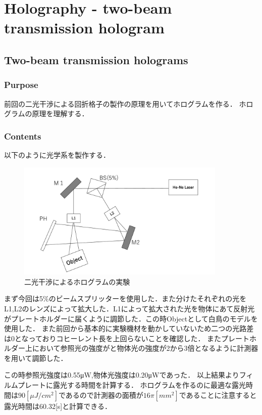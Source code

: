 \documentclass[11pt, a4paper]{jsarticle}
\begin{document}
\section{Holography - two-beam transmission hologram}
\subsection{Two-beam transmission holograms}
\subsubsection{Purpose}
前回の二光干渉による回折格子の製作の原理を用いてホログラムを作る．
ホログラムの原理を理解する．
\subsubsection{Contents}
以下のように光学系を製作する．

\begin{figure}[htbp]
 \begin{center}
  \includegraphics[width=100mm]{fig23.png}
 \end{center}
 \caption{二光干渉によるホログラムの実験}
 \label{fig:23}
\end{figure}

まず今回は5\%のビームスプリッターを使用した．また分けたそれぞれの光をL1,L2のレンズによって拡大した．L1によって拡大された光を物体にあて反射光がプレートホルダーに届くように調節した．この時Objectとして白鳥のモデルを使用した．
また前回から基本的に実験機材を動かしていないため二つの光路差は0となっておりコヒーレント長を上回らないことを確認した．
またプレートホルダー上において参照光の強度がと物体光の強度が2から3倍となるように計測器を用いて調節した．

この時参照光強度は0.55μW,物体光強度は0.20μWであった．
以上結果よりフィルムプレートに露光する時間を計算する．
ホログラムを作るのに最適な露光時間は$90[\mu J/cm^2]$であるので計測器の面積が$16\pi [mm^2]$であることに注意すると露光時間は60.32[s]と計算できる．
\end{document}
